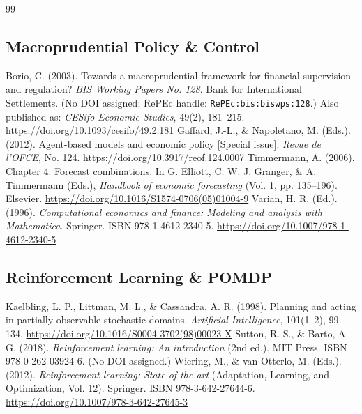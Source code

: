 \documentclass[11pt]{article}
\begin{document}
\begin{thebibliography}{99}
\subsection{Macroprudential Policy \& Control}
 Borio, C. (2003). Towards a macroprudential framework for financial supervision and regulation? \textit{BIS Working Papers No. 128}. Bank for International Settlements. (No DOI assigned; RePEc handle: \texttt{RePEc:bis:biswps:128}.) Also published as: \textit{CESifo Economic Studies}, 49(2), 181--215. \url{https://doi.org/10.1093/cesifo/49.2.181}
 Gaffard, J.-L., \& Napoletano, M. (Eds.). (2012). Agent-based models and economic policy [Special issue]. \textit{Revue de l'OFCE}, No. 124. \url{https://doi.org/10.3917/reof.124.0007}
 Timmermann, A. (2006). Chapter 4: Forecast combinations. In G. Elliott, C. W. J. Granger, \& A. Timmermann (Eds.), \textit{Handbook of economic forecasting} (Vol. 1, pp. 135--196). Elsevier. \url{https://doi.org/10.1016/S1574-0706(05)01004-9}
 Varian, H. R. (Ed.). (1996). \textit{Computational economics and finance: Modeling and analysis with Mathematica\textregistered}. Springer. ISBN 978-1-4612-2340-5. \url{https://doi.org/10.1007/978-1-4612-2340-5}
\subsection{Reinforcement Learning \& POMDP}
 Kaelbling, L. P., Littman, M. L., \& Cassandra, A. R. (1998). Planning and acting in partially observable stochastic domains. \textit{Artificial Intelligence}, 101(1--2), 99--134. \url{https://doi.org/10.1016/S0004-3702(98)00023-X}
 Sutton, R. S., \& Barto, A. G. (2018). \textit{Reinforcement learning: An introduction} (2nd ed.). MIT Press. ISBN 978-0-262-03924-6. (No DOI assigned.)
 Wiering, M., \& van Otterlo, M. (Eds.). (2012). \textit{Reinforcement learning: State-of-the-art} (Adaptation, Learning, and Optimization, Vol. 12). Springer. ISBN 978-3-642-27644-6. \url{https://doi.org/10.1007/978-3-642-27645-3}
\end{thebibliography}
\end{document}
